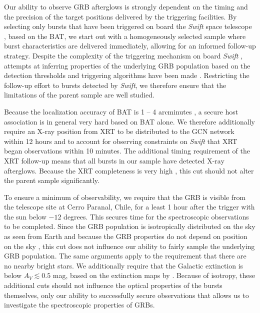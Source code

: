\documentclass{aa}    %
\begin{document}
Our ability to observe GRB afterglows is strongly dependent on the timing and
the precision of the target positions delivered by the triggering facilities. By
selecting only bursts that have been triggered on board the \textit{Swift} space
telescope \citep{Gehrels2004}, based on the BAT, we  start out with a homogeneously selected sample where
burst characteristics are delivered immediately, allowing for an informed
follow-up strategy. Despite the complexity of the triggering mechanism on board
\textit{Swift} \citep{Band2006, Coward2013a}, attempts at inferring properties
of the underlying GRB population based on the detection thresholds and
triggering algorithms have been made \citep{Lien2014, Graff2016}. Restricting
the follow-up effort to bursts detected by \textit{Swift}, we therefore ensure
that the limitations of the parent sample are well studied.

Because the localization accuracy of BAT is 1 -- 4 arcminutes
\citep{Barthelmy2005}, a secure host association is in general very hard based
on BAT alone. We therefore additionally require an X-ray position from XRT to be
distributed to the GCN network \citep{Barthelmy2000} within 12 hours and to
account for observing constraints on \textit{Swift} that XRT began observations
within 10 minutes. The additional timing requirement of the XRT follow-up means
that all bursts in our sample have detected X-ray afterglows. Because the XRT
completeness is very high \citep{Burrows2007}, this cut should not alter the
parent sample significantly.

To ensure a minimum of observability, we require that the GRB is visible from
the telescope site at Cerro Paranal, Chile, for a least 1 hour after the trigger
with the sun below $-12$ degrees. This secures time for the spectroscopic
observations to be completed. Since the GRB population is isotropically distributed
on the sky as seen from Earth and because the GRB properties do not depend on
position on the sky \citep{Meegan1992, Briggs1996}, this cut does not influence our ability
to fairly sample the underlying GRB population. The same arguments apply to
the requirement that there are no nearby bright stars. We additionally require
that the Galactic extinction is below $A_V \lesssim 0.5$ mag, based on the
extinction maps by \citet{Schlegel1998}. Because of isotropy, these additional
cuts should not influence the optical properties of the bursts themselves, only
our ability to successfully secure observations that allows us to investigate
the spectroscopic properties of GRBs.
\end{document}
